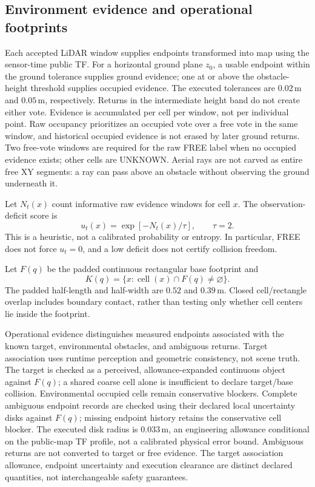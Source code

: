 \subsection{Environment evidence and operational footprints}
\label{sec:evidence}
Each accepted LiDAR window supplies endpoints transformed into map using the
sensor-time public TF. For a horizontal ground plane $z_0$, a usable endpoint
within the ground tolerance supplies ground evidence; one at or above the
obstacle-height threshold supplies occupied evidence. The executed tolerances
are $0.02\,\mathrm{m}$ and $0.05\,\mathrm{m}$, respectively. Returns in the
intermediate height band do not create either vote. Evidence is accumulated
per cell per window, not per individual point. Raw occupancy prioritizes an
occupied vote over a free vote in the same window, and historical occupied
evidence is not erased by later ground returns. Two free-vote windows are
required for the raw FREE label when no occupied evidence exists; other cells
are UNKNOWN. Aerial rays are not carved as entire free XY segments: a ray can
pass above an obstacle without observing the ground underneath it.

Let $N_t(x)$ count informative raw evidence windows for cell $x$. The
observation-deficit score is
\begin{equation}
 u_t(x)=\exp[-N_t(x)/\tau],\qquad \tau=2.
 \label{eq:deficit}
\end{equation}
This is a heuristic, not a calibrated probability or entropy. In particular,
FREE does not force $u_t=0$, and a low deficit does not certify collision freedom.

Let $F(q)$ be the padded continuous rectangular base footprint and
\begin{equation}
 K(q)=\{x:\operatorname{cell}(x)\cap F(q)\ne\varnothing\}.
 \label{eq:footprint}
\end{equation}
The padded half-length and half-width are $0.52$ and $0.39\,\mathrm{m}$.
Closed cell/rectangle overlap includes boundary contact, rather than testing
only whether cell centers lie inside the footprint.

Operational evidence distinguishes measured endpoints associated with the
known target, environmental obstacles, and ambiguous returns. Target association
uses runtime perception and geometric consistency, not scene truth. The target
is checked as a perceived, allowance-expanded continuous object against $F(q)$;
a shared coarse cell alone is insufficient to declare target/base collision.
Environmental occupied cells remain conservative blockers. Complete ambiguous
endpoint records are checked using their declared local uncertainty disks
against $F(q)$; missing endpoint history retains the conservative cell blocker.
The executed disk radius is $0.033\,\mathrm{m}$, an engineering allowance
conditional on the public-map TF profile, not a calibrated physical error bound.
Ambiguous returns are not converted to target or free evidence. The target
association allowance, endpoint uncertainty and execution clearance are distinct
declared quantities, not interchangeable safety guarantees.

